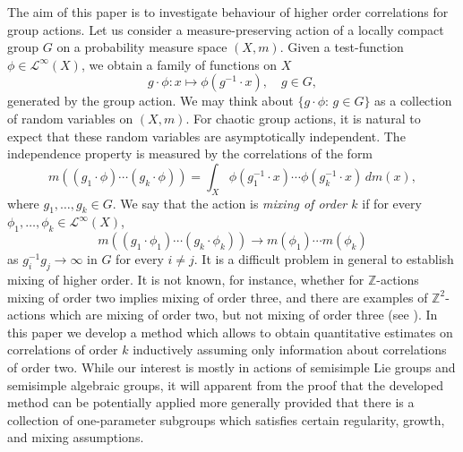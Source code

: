 \documentclass[11pt,reqno,a4paper]{amsart}
\numberwithin{equation}{section}
\newcommand{\cL}{\mathcal{L}}
\newcommand{\bZ}{\mathbb{Z}}
\theoremstyle{theorem}
\theoremstyle{definition}
\begin{document}
The aim of this paper is to investigate behaviour of higher order correlations
for group actions.
Let us consider a measure-preserving action of a locally compact group $G$ on a probability measure space $(X,m)$. Given a test-function $\phi\in \cL^\infty(X)$,
we obtain a family of functions on $X$
$$
g\cdot \phi: x\mapsto \phi(g^{-1}\cdot x),\quad g\in G,
$$
generated by the group action. 
We may think about $\{g\cdot \phi:\, g\in G\}$ as a collection of random variables
on $(X,m)$. For chaotic group actions, it is natural to expect that these
random variables are asymptotically independent.
The independence property is measured by the correlations of the form
$$
m((g_1 \cdot \phi) \cdots (g_k \cdot \phi))=\int_X \phi(g_1^{-1}\cdot x)\cdots \phi(g_k^{-1}\cdot x)\, dm(x),
$$
where $g_1,\ldots, g_k\in G$.
We say that the action is \emph{mixing of order $k$} if for every 
$\phi_1,\ldots, \phi_k\in \cL^\infty(X)$,
$$
m((g_1 \cdot \phi_1) \cdots (g_k \cdot \phi_k))\longrightarrow 
m(\phi_1) \cdots m(\phi_k)
$$
as $g_i^{-1}g_j\to \infty$ in $G$ for every $i\ne j$.
It is a difficult problem in general to establish mixing of higher order.
It is not known, for instance, whether for $\bZ$-actions mixing of order two
implies mixing of order three, and there are examples of $\bZ^2$-actions which are mixing of order two, but not mixing of order three (see \cite{led}).
In this paper we develop a method which allows to obtain quantitative estimates on correlations of order $k$ inductively assuming only information about correlations of order two. While our interest is mostly in actions of semisimple Lie groups
and semisimple algebraic groups, it will apparent from the proof that the developed
method can be 
potentially applied more generally provided that there is a collection of one-parameter subgroups which satisfies certain regularity, growth, and mixing assumptions.
\end{document}
